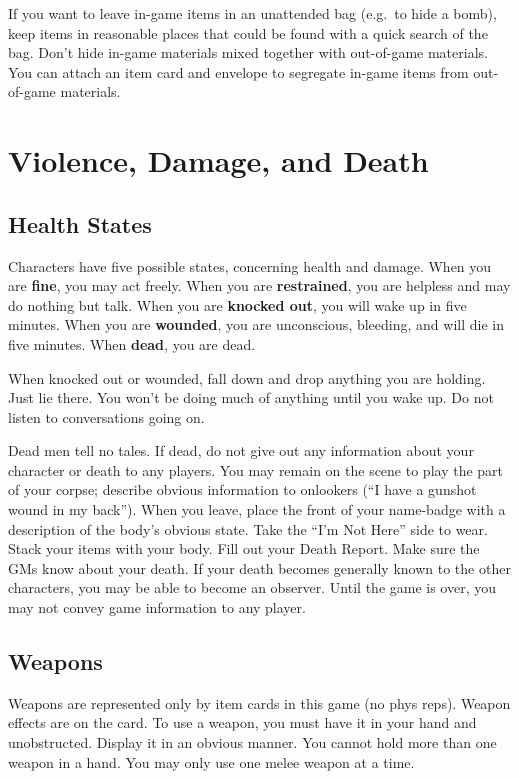 \documentclass[sheet]{GL2020}
\begin{document}
If you want to leave in-game items in an unattended bag (e.g.\ to hide a bomb), keep items in reasonable places that could be found with a quick search of the bag.  Don't hide in-game materials mixed together with out-of-game materials.  You can attach an item card and envelope to segregate in-game items from out-of-game materials.

\section{Violence, Damage, and Death}

\subsection{Health States}

Characters have five possible states, concerning health and damage. When you are {\bf fine}, you may act freely.  When you are {\bf restrained}, you are helpless and may do nothing but talk.  When you are {\bf knocked out}, you will wake up in five minutes.  When you are {\bf wounded}, you are unconscious, bleeding, and will die in five minutes.  When {\bf dead}, you are dead.

When knocked out or wounded, fall down and drop anything you are holding.  Just lie there.  You won't be doing much of anything until you wake up.  Do not listen to conversations going on.

Dead men tell no tales.  If dead, do not give out any information about your character or death to any players.  You may remain on the scene to play the part of your corpse; describe obvious information to onlookers (``I have a gunshot wound in my back'').  When you leave, place the front of your name-badge with a description of the body's obvious state.  Take the ``I'm Not Here'' side to wear.  Stack your items with your body.  Fill out your Death Report.  Make sure the GMs know about your death.  If your death becomes generally known to the other characters, you may be able to become an observer.  Until the game is over, you may not convey game information to any player.

\subsection{Weapons}

Weapons are represented only by item cards in this game (no phys reps). Weapon effects are on the card.  To use a weapon, you must have it in your hand and unobstructed.  Display it in an obvious manner.  You cannot hold more than one weapon in a hand.  You may only use one melee weapon at a time.
\end{document}
